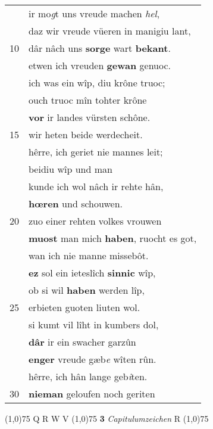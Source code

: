 \documentclass[8pt,a4paper,notitlepage]{article}
\begin{document}
\begin{table}[ht]
\begin{minipage}[t]{0.5\linewidth}
\begin{tabular}{rl}
 & ir mo\textit{g}t uns vreude machen \textit{hel},\\ 
 & daz wir vreude vüeren in manigiu lant,\\ 
10 & dâr nâch uns \textbf{sorge} wart \textbf{bekant}.\\ 
 & etwen ich vreuden \textbf{gewan} genuoc.\\ 
 & ich was ein wîp, diu krône truoc;\\ 
 & ouch truoc mîn tohter krône\\ 
 & \textbf{vor} ir landes vürsten schône.\\ 
15 & wir heten beide werdecheit.\\ 
 & hêrre, ich geriet nie mannes leit;\\ 
 & beidiu wîp und man\\ 
 & kunde ich wol nâch ir rehte hân,\\ 
 & \textbf{hœren} und schouwen.\\ 
20 & zuo einer rehten volkes vrouwen\\ 
 & \textbf{muost} man mich \textbf{haben}, ruocht es got,\\ 
 & wan ich nie manne missebôt.\\ 
 & \textbf{ez} sol ein ieteslîch \textbf{sinnic} wîp,\\ 
 & ob si wil \textbf{haben} werden lîp,\\ 
25 & erbieten guoten liuten wol.\\ 
 & si kumt vil lîht in kumbers dol,\\ 
 & \textbf{dâr} ir ein swacher garzûn\\ 
 & \textbf{enger} vreude gæb\textit{e} wîten rûn.\\ 
 & hêrre, ich hân lange geb\textit{i}ten.\\ 
30 & \textbf{nieman} geloufen noch geriten\\ 
\end{tabular}
\scriptsize
\line(1,0){75} \newline
Q R W V \newline
\line(1,0){75} \newline
\textbf{3} \textit{Capitulumzeichen} R  \newline
\line(1,0){75} \newline

\end{minipage}
\end{table}
\end{document}
